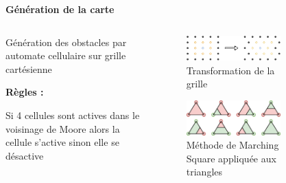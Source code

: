 \documentclass[aspectratio=169,10pt]{beamer}
\begin{document}
\begin{frame}{\textbf{Génération de la carte}}
	\begin{columns}[t]
		\begin{column}{0.33\textwidth}

			\vspace{1em}
			Génération des obstacles par automate cellulaire sur grille cartésienne
			\vspace{1em}
			
			\textbf{Règles :}

			\vspace{1em}

			Si 4 cellules sont actives dans le voisinage de Moore alors la cellule s'active sinon elle se désactive
		\end{column}

		\begin{column}{0.33\textwidth}
			\begin{figure}
				\centering
				\includegraphics[width=0.9\textwidth]{IMAGES/grid_transform_map_generation.png}
				\caption{Transformation de la grille}
				\label{fig:map_generation_step3}
			\end{figure}
			\begin{figure}
				\centering
				\includegraphics[width=0.9\textwidth]{IMAGES/marching_square_triangle.png}
				\caption{Méthode de Marching Square appliquée aux triangles}
				\label{fig:map_generation_step1}
			\end{figure}
		\end{column}
		\begin{column}{0.33\textwidth}
			\begin{figure}
				\centering

\end{figure}
\end{column}
\end{columns}
\end{frame}
\end{document}
